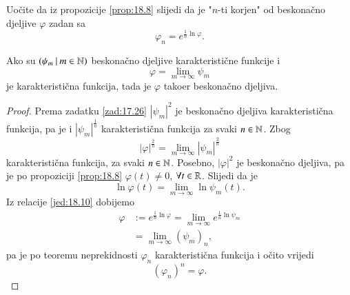 Uo\v cite da iz propozicije \ref{prop:18.8} slijedi da je "$n$-ti korjen" od beskona\v cno djeljive $\varphi$ zadan sa
\begin{equation}    \label{jed:18.10}
    \varphi_n = e^{\frac{1}{n} \ln \varphi}.
\end{equation}

\begin{prop}    \label{prop: 18.11}
    Ako su $({\psi_m} \: | \: {m \in \mathbb{N}})$ beskona\v cno djeljive karakteristi\v cne funkcije i
    \begin{equation*}
        \varphi = \lim\limits_{m \to \infty} \psi_m
    \end{equation*}
    je karakteristi\v cna funkcija, tada je $\varphi$ tako\dj er beskona\v cno djeljiva.
\end{prop}

\begin{proof}
    Prema zadatku \ref{zad:17.26} $|\psi_m|^2$ je beskona\v cno djeljiva karakteristi\v cna funkcija, pa je i $|\psi_m|^\frac{1}{n}$ karakteristi\v cna funkcija za svaki $n \in \mathbb{N}$.
    Zbog
    \begin{equation*}
        |\varphi|^\frac{2}{n} = \lim\limits_{m \to \infty} |\psi_m|^\frac{2}{n}
    \end{equation*}
    karakteristi\v cna funkcija, za svaki $n \in \mathbb{N}$.
    Posebno, $|\varphi|^2$ je beskona\v cno djeljiva, pa je po propoziciji \ref{prop:18.8} $\varphi (t) \neq 0$, $\forall t \in \mathbb{R}$.
    Slijedi da je
    \begin{equation*}
        \ln \varphi (t) = \lim\limits_{m \to \infty} \ln \psi_m (t).
    \end{equation*}
    Iz relacije \eqref{jed:18.10} dobijemo
    \begin{equation*}
        \begin{aligned}
            \varphi &:= e^{\frac{1}{n} \ln \varphi} = \lim\limits_{m \to \infty} e^{\frac{1}{n} \ln \psi_m}\\
            &= \lim_{m \to \infty} (\psi_m)_n,    %
        \end{aligned}
    \end{equation*}
    pa je po teoremu neprekidnosti $\varphi_n$ karakteristi\v cna funkcija i o\v cito vrijedi
    \begin{equation*}
        (\varphi_n)^n = \varphi.
    \end{equation*}
\end{proof}


